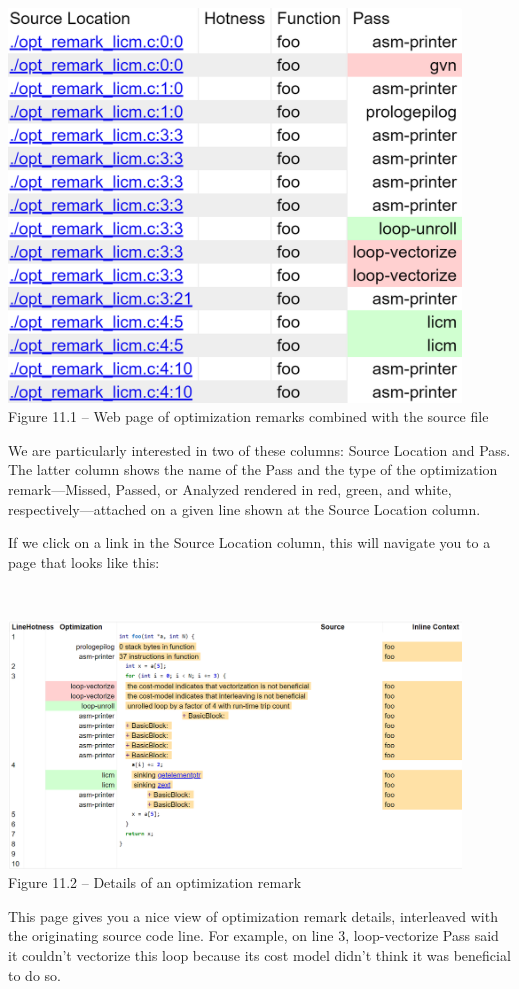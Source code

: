 \begin{enumerate}
\hspace*{\fill} \\ %
\begin{center}
\includegraphics[width=0.9\textwidth]{content/3/chapter11/images/1.png}\\
Figure 11.1 – Web page of optimization remarks combined with the source file
\end{center}

We are particularly interested in two of these columns: Source Location and Pass. The latter column shows the name of the Pass and the type of the optimization remark—Missed, Passed, or Analyzed rendered in red, green, and white, respectively—attached on a given line shown at the Source Location column.

If we click on a link in the Source Location column, this will navigate you to a page that looks like this:

\hspace*{\fill} \\ %
\begin{center}
\includegraphics[width=0.9\textwidth]{content/3/chapter11/images/2.png}\\
Figure 11.2 – Details of an optimization remark
\end{center}

This page gives you a nice view of optimization remark details, interleaved with the originating source code line. For example, on line 3, loop-vectorize Pass said it couldn't vectorize this loop because its cost model didn't think it was beneficial to do so.

\end{enumerate}

